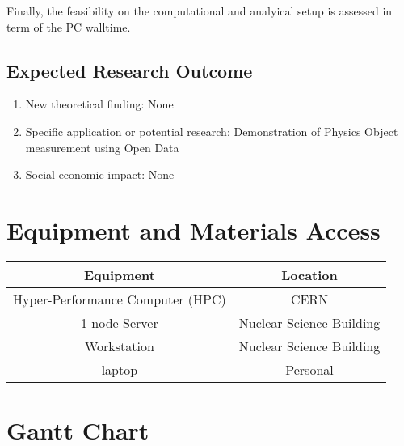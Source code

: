 \documentclass[]{article}
\begin{document}
Finally, the feasibility on the computational and analyical setup is assessed in term of the PC walltime.

\subsection{Expected Research Outcome}

\begin{enumerate}
  \item New theoretical finding: None
  \item Specific application or potential research: Demonstration of Physics Object measurement using Open Data
  \item Social economic impact: None
\end{enumerate}

\section{Equipment and Materials Access}

\begin{table}[H]
\centering
\begin{tabular}{|c|c|}
\hline
Equipment                        & Location                 \\ \hline
Hyper-Performance Computer (HPC) & CERN                     \\ \hline
1 node Server                    & Nuclear Science Building \\ \hline
Workstation                      & Nuclear Science Building \\ \hline
laptop                           & Personal                 \\ \hline
\end{tabular}
\end{table}

\section{Gantt Chart}


\end{document}
